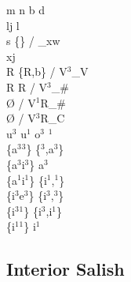 \documentclass[11pt]{article}
\begin{document}
m n \textrightarrow\hspace{0pt} b d \\
l\super j \textrightarrow\hspace{0pt} l \\
s \textrightarrow\hspace{0pt} \{\} / _x\super w \\
x\super j \textrightarrow\hspace{0pt}  \\
R \textrightarrow\hspace{0pt} \{R,b\} / V$^3$_V \\
R \textrightarrow\hspace{0pt} R / V$^3$_\# \\
 \textrightarrow\hspace{0pt} \O\hspace{0pt} / V$^1$R_\# \\
 \textrightarrow\hspace{0pt} \O\hspace{0pt} / V$^3$R_C \\
u$^3$ u$^1$ \textrightarrow\hspace{0pt} o$^3$ $^1$ \\
\{a$^3$\raisebox{-0.7ex}{\textasciitilde}$^3$\} \textrightarrow\hspace{0pt} \{$^3$,a$^3$\} \\
\{a$^3$\raisebox{-0.7ex}{\textasciitilde}i$^3$\} \textrightarrow\hspace{0pt} a$^3$ \\
\{a$^1$\raisebox{-0.7ex}{\textasciitilde}i$^1$\} \textrightarrow\hspace{0pt} \{i$^1$,$^1$\} \\
\{i$^3$\raisebox{-0.7ex}{\textasciitilde}e$^3$\} \textrightarrow\hspace{0pt} \{i$^3$,$^3$\} \\
\{i$^3$\raisebox{-0.7ex}{\textasciitilde}$^1$\} \textrightarrow\hspace{0pt} \{i$^3$,i$^1$\} \\
\{i$^1$\raisebox{-0.7ex}{\textasciitilde}$^1$\} \textrightarrow\hspace{0pt} i$^1$

\subsection{Interior Salish}
\end{document}
